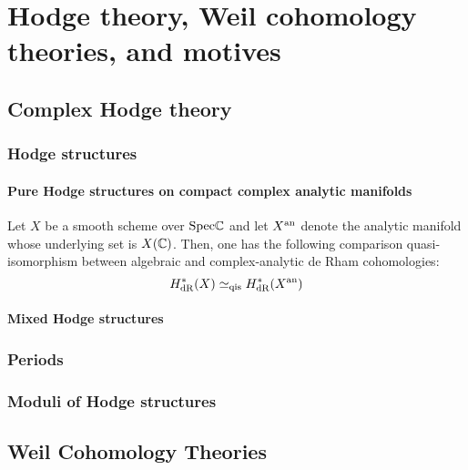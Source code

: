 \chapter{Hodge theory, Weil cohomology theories, and motives}
    \begin{abstract}
        
    \end{abstract}
    
    \minitoc
    
    \section{Complex Hodge theory}
        \subsection{Hodge structures}
            \subsubsection{Pure Hodge structures on compact complex analytic manifolds}
                \begin{theorem} \label{theorem: de_rham_cohomology}
                    Let $X$ be a smooth scheme over $\mathrm{Spec} \mathbb{C}$ and let $X^{\mathrm{an}}$ denote the analytic manifold whose underlying set is $X(\mathbb{C})$. Then, one has the following comparison quasi-isomorphism between algebraic and complex-analytic de Rham cohomologies:
                        $$H^*_{\mathrm{dR}}(X) \simeq_{\mathrm{qis}} H^*_{\mathrm{dR}}(X^{\mathrm{an}})$$
                \end{theorem}
            
            \subsubsection{Mixed Hodge structures}
        
        \subsection{Periods}
        
        \subsection{Moduli of Hodge structures}
    
    \section{Weil Cohomology Theories}
